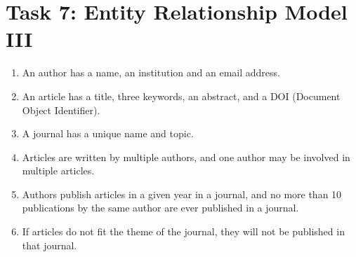 \documentclass{article}
\begin{document}

\section*{Task 7: Entity Relationship Model III}
\begin{enumerate}
\item An author has a name, an institution and an email address.

\item An article has a title, three keywords, an abstract, and a DOI (Document Object Identifier).

\item A journal has a unique name and topic.

\item Articles are written by multiple authors, and one author may be involved in multiple articles.

\item Authors publish articles in a given year in a journal, and no more than 10 publications by
the same author are ever published in a journal.

\item If articles do not fit the theme of the journal, they will not be published in that journal.
\end{enumerate}


\printbibliography
\end{document}
